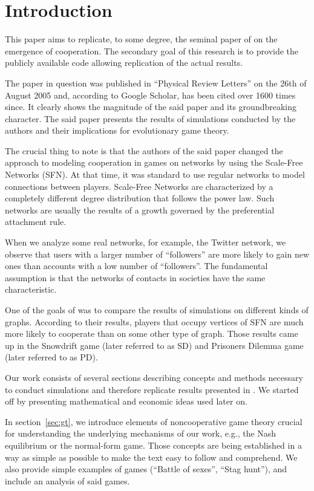 \documentclass[english, twoside, 12pt, a4paper]{article}
\theoremstyle{definition}
\theoremstyle{plain}
\theoremstyle{remark}
\begin{document}
\section{Introduction}

This paper aims to replicate, to some degree, the seminal paper of \cite{santos2005scale} on the emergence of cooperation. The secondary goal of this research is to provide the publicly available code allowing replication of the actual results.
 
The paper in question was published in \enquote{Physical Review Letters} on the 26th of August 2005 and, according to Google Scholar, has been cited over 1600 times since. It clearly shows the magnitude of the said paper and its groundbreaking character. The said paper presents the results of simulations conducted by the authors and their implications for evolutionary game theory.
 
The crucial thing to note is that the authors of the said paper changed the approach to modeling cooperation in games on networks by using the Scale-Free Networks (SFN). At that time, it was standard to use regular networks to model connections between players. Scale-Free Networks are characterized by a completely different degree distribution that follows the power law. Such networks are usually the results of a growth governed by the preferential attachment rule. 

When we analyze some real networks, for example, the Twitter network, we observe that users with a larger number of \enquote{followers} are more likely to gain new ones than accounts with a low number of \enquote{followers}. The fundamental assumption is that the networks of contacts in societies have the same characteristic. 
 
One of the goals of \cite{santos2005scale} was to compare the results of simulations on different kinds of graphs. According to their results, players that occupy vertices of SFN are much more likely to cooperate than on some other type of graph. Those results came up in the Snowdrift game (later referred to as SD) and Prisoners Dilemma game (later referred to as PD).  

Our work consists of several sections describing concepts and methods necessary to conduct simulations and therefore replicate results presented in \cite{santos2005scale}. We started off by presenting mathematical and economic ideas used later on. 

In section~\ref{sec:gt}, we introduce elements of noncooperative game theory crucial for understanding the underlying mechanisms of our work, e.g., the Nash equilibrium or the normal-form game. Those concepts are being established in a way as simple as possible to make the text easy to follow and comprehend. We also provide simple examples of games (\enquote{Battle of sexes}, \enquote{Stag hunt}), and include an analysis of said games.
\end{document}
